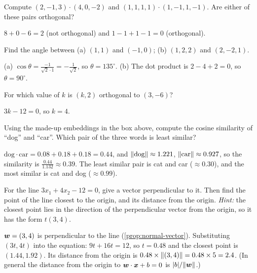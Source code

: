 \begin{exercise}
Compute $(2, -1, 3)\cdot(4, 0, -2)$ and $(1, 1, 1, 1)\cdot(1, -1, 1, -1)$. Are
either of these pairs orthogonal?
\end{exercise}
\begin{solution}
$8 + 0 - 6 = 2$ (not orthogonal) and $1 - 1 + 1 - 1 = 0$ (orthogonal).
\end{solution}

\begin{exercise}
Find the angle between (a) $(1, 1)$ and $(-1, 0)$; (b) $(1, 2, 2)$ and
$(2, -2, 1)$.
\end{exercise}
\begin{solution}
(a) $\cos\theta = \tfrac{-1}{\sqrt2\cdot1} = -\tfrac{1}{\sqrt2}$, so
$\theta = 135^\circ$. (b) The dot product is $2 - 4 + 2 = 0$, so
$\theta = 90^\circ$.
\end{solution}

\begin{exercise}
For which value of $k$ is $(k, 2)$ orthogonal to $(3, -6)$?
\end{exercise}
\begin{solution}
$3k - 12 = 0$, so $k = 4$.
\end{solution}

\begin{exercise}
Using the made-up embeddings in the box above, compute the cosine similarity of
``dog'' and ``car''. Which pair of the three words is least similar?
\end{exercise}
\begin{solution}
$\text{dog}\cdot\text{car} = 0.08 + 0.18 + 0.18 = 0.44$, and
$\lVert\text{dog}\rVert \approx 1.221$, $\lVert\text{car}\rVert \approx 0.927$, so the
similarity is $\tfrac{0.44}{1.132} \approx 0.39$. The least similar pair is
cat and car ($\approx 0.30$), and the most similar is cat and dog
($\approx 0.99$).
\end{solution}

\begin{exercise}
For the line $3x_1 + 4x_2 - 12 = 0$, give a vector perpendicular to it. Then
find the point of the line closest to the origin, and its distance from the
origin. \emph{Hint:} the closest point lies in the direction of the
perpendicular vector from the origin, so it has the form $t(3, 4)$.
\end{exercise}
\begin{solution}
$\bm{w} = (3, 4)$ is perpendicular to the line (\cref{prop:normal-vector}).
Substituting $(3t, 4t)$ into the equation: $9t + 16t = 12$, so $t = 0.48$ and
the closest point is $(1.44, 1.92)$. Its distance from the origin is
$0.48 \times \lVert(3,4)\rVert = 0.48 \times 5 = 2.4$. (In general the distance
from the origin to $\bm{w}\cdot\bm{x} + b = 0$ is $\lvert b\rvert/\lVert\bm{w}\rVert$.)
\end{solution}

